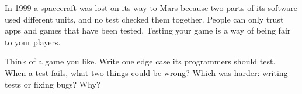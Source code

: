 \begin{tip}
In 1999 a spacecraft was lost on its way to Mars because two parts of its software used different units, and no test checked them together.
People can only trust apps and games that have been tested. Testing your game is a way of being fair to your players.
\end{tip}

\begin{vocab}
\end{vocab}

\begin{reflection}
Think of a game you like. Write one edge case its programmers should test. 
When a test fails, what two things could be wrong? 
Which was harder: writing tests or fixing bugs? Why? 
\end{reflection}
